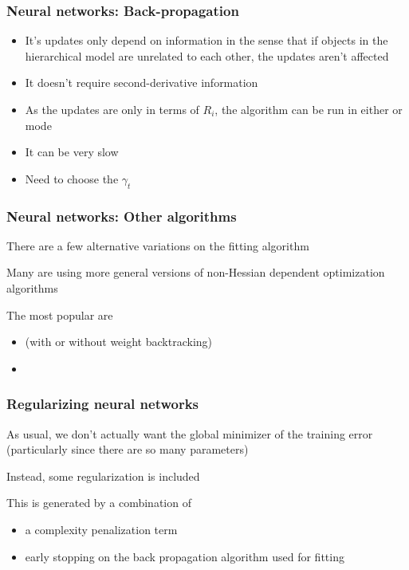 \documentclass[12pt]{beamer}
\begin{document}
\begin{frame}[fragile]
\frametitle{Neural networks: Back-propagation}
\begin{itemize}
\item It's updates only depend on  information in the sense that if objects in the hierarchical model
are unrelated to each other, the updates aren't affected

\item It doesn't require second-derivative information
\item As the updates are only in terms of $R_i$, the algorithm can be run in either  or 
mode
\end{itemize}
\begin{itemize}
\item It can be very slow
\item Need to choose the  $\gamma_t$

\end{itemize}

\end{frame}

\begin{frame}[fragile]
\frametitle{Neural networks: Other algorithms}
There are a few alternative variations on the fitting algorithm

\vsp
Many are using more general versions of non-Hessian dependent optimization algorithms


\vsp
The most popular are
\begin{itemize}
\item {} (with or without weight backtracking) 

\item {}

\end{itemize}
\end{frame}

\begin{frame}[fragile]
\frametitle{Regularizing neural networks}
As usual, we don't actually want the global minimizer of the training error (particularly since there are so many parameters)

\vsp
Instead, some regularization is included

\vsp
This is generated by a combination of
\begin{itemize}
\item a complexity penalization term
\item early stopping on the back propagation algorithm used for fitting

\end{itemize}
\end{frame}
\end{document}
